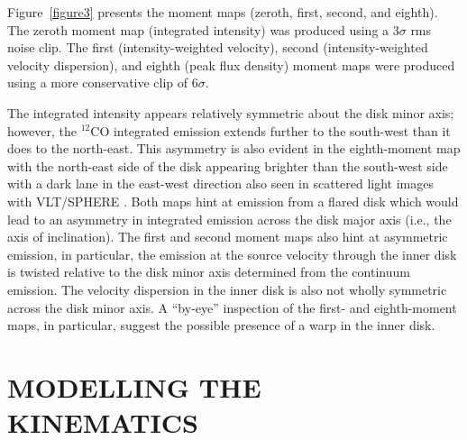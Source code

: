 \documentclass[onecolumn]{aastex6}
\newcommand{\kms}{km~s$^{-1}$}
\newcommand{\perbeam}{beam$^{-1}$}
\begin{document}
Figure~\ref{figure3} presents the moment maps 
(zeroth, first, second, and eighth).  
The zeroth moment map (integrated intensity) was produced using 
a $3\sigma$ rms noise clip.  
The first (intensity-weighted velocity), second (intensity-weighted velocity dispersion), 
and eighth (peak flux density) moment maps were produced using a more 
conservative clip of $6\sigma$.  

The integrated intensity appears relatively symmetric about the 
disk minor axis; however, the $^{12}$CO integrated emission extends 
further to the south-west than it does to the north-east.  
This asymmetry is also evident in the eighth-moment map with the 
north-east side of the disk appearing brighter than the south-west side 
with a dark lane in the east-west direction also seen in scattered 
light images with VLT/SPHERE \citep{garufi16}. 
Both maps hint at emission from a flared disk which would lead to an 
asymmetry in integrated emission across the disk major axis (i.e., the axis of inclination).   
The first and second moment maps also hint at asymmetric emission, in particular, 
the emission at the source velocity through the inner disk is twisted relative to the 
disk minor axis determined from the continuum emission.  
The velocity dispersion in the inner disk is also not wholly symmetric across 
the disk minor axis.  
A ``by-eye'' inspection of the first- and eighth-moment maps, 
in particular, suggest the possible presence of a warp in the inner disk.  


\section{MODELLING THE KINEMATICS}
\label{modelkinematics}
\end{document}
